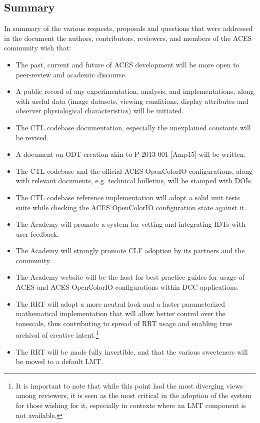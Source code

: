 \documentclass[conference]{IEEEtran}
\begin{document}
\subsection{Summary}
In summary of the various requests, proposals and questions that were addressed in the document the authors, contributors, reviewers, and members of the ACES community wish that:
\begin{itemize}
    \item The past, current and future of ACES development will be more open to peer-review and academic discourse.
    \item A public record of any experimentation, analysis, and implementations, along with useful data (image datasets, viewing conditions, display attributes and observer physiological characteristics) will be initiated.
    \item The CTL codebase documentation, especially the unexplained constants will be revised.
    \item A document on ODT creation akin to P-2013-001 [Amp15] will be written.
    \item The CTL codebase and the official ACES OpenColorIO configurations, along with relevant documents, e.g. technical bulletins, will be stamped with DOIs.
    \item The CTL codebase reference implementation will adopt a solid unit tests suite while checking the ACES OpenColorIO configuration state against it.
    \item The Academy will promote a system for vetting and integrating IDTs with user feedback.
    \item The Academy will strongly promote CLF adoption by its partners and the community.
    \item The Academy website will be the host for best practice guides for usage of ACES and ACES OpenColorIO configurations within DCC applications.
    \item The RRT will adopt a more neutral look and a faster parameterized mathematical implementation that will allow better control over the tonescale, thus contributing to spread of RRT usage and enabling true archival of creative intent.\footnote{It is important to note that while this point had the most diverging views among reviewers, it is seen as the most critical in the adoption of the system for those wishing for it, especially in contexts where an LMT component is not available.}
    \item The RRT will be made fully invertible, and that the various sweeteners will be moved to a default LMT.

\end{itemize}
\end{document}
